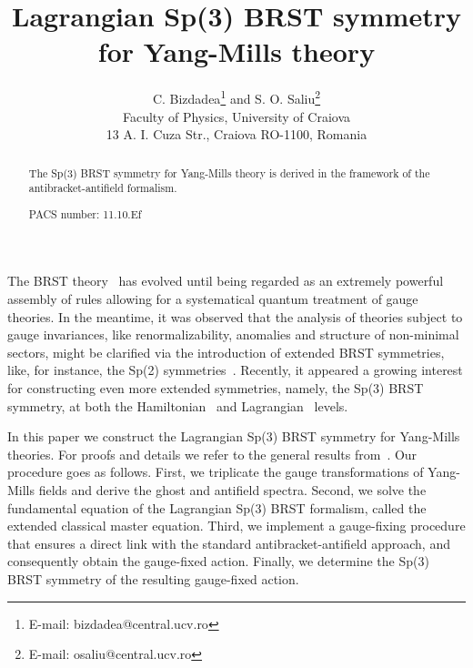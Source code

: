 \documentclass[a4paper,10pt]{article}
\begin{document}
\author{C. Bizdadea\thanks{%
E-mail: bizdadea@central.ucv.ro} and S. O. Saliu\thanks{%
E-mail: osaliu@central.ucv.ro}\\
Faculty of Physics, University of Craiova\\
13 A. I. Cuza Str., Craiova RO-1100, Romania}
\title{Lagrangian Sp(3) BRST symmetry for Yang-Mills theory}

\maketitle

\begin{abstract}
The Sp(3) BRST symmetry for Yang-Mills theory is derived in the framework of
the antibracket-antifield formalism.

PACS number: 11.10.Ef
\end{abstract}

The BRST theory~\cite{1,2,9,8,12} has evolved until being regarded as an
extremely powerful assembly of rules allowing for a systematical quantum
treatment of gauge theories. In the meantime, it was observed that the
analysis of theories subject to gauge invariances, like renormalizability,
anomalies and structure of non-minimal sectors, might be clarified via the
introduction of extended BRST symmetries, like, for instance, the Sp(2)
symmetries~\cite{20,22,29,37}. Recently, it appeared a growing interest for
constructing even more extended symmetries, namely, the Sp(3) BRST symmetry,
at both the Hamiltonian~\cite{38} and Lagrangian~\cite{sp3gen} levels.

In this paper we construct the Lagrangian Sp(3) BRST symmetry for 
Yang-Mills theories. For proofs and details we refer to the
general results from~\cite{sp3gen}. Our procedure goes as follows.
First, we triplicate the gauge transformations of
Yang-Mills fields and derive the ghost and antifield spectra. Second, we
solve the fundamental equation of the Lagrangian Sp(3) BRST formalism,
called the extended classical master equation. Third, we implement a
gauge-fixing procedure that ensures a direct link with the standard
antibracket-antifield approach, and consequently obtain the gauge-fixed
action. Finally, we determine the Sp(3) BRST symmetry of the resulting
gauge-fixed action.
\end{document}
